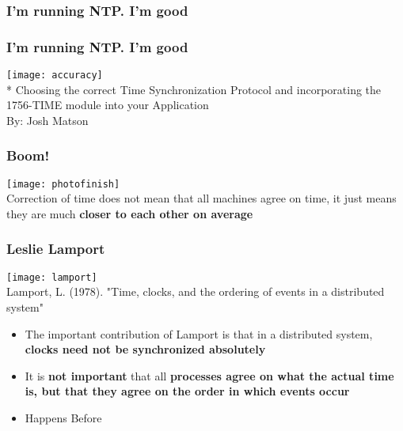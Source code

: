 \documentclass[aspectratio=169, 15pt,usenames,dvipsnames]{beamer}
\begin{document}
	\begin{gdblank}
		\frametitle{I'm running NTP. I'm good}
		\centering													   
		\LARGE
	\end{gdblank}
	\begin{gdblank}
		\frametitle{I'm running NTP. I'm good}
		\centering
		\texttt{[image: accuracy]}
		\\\tiny
		* Choosing the correct Time Synchronization Protocol and incorporating the 1756-TIME module into your Application \\ By: Josh Matson
	\end{gdblank}
	\begin{gdblank}
		\frametitle{Boom!}
		\centering
		\texttt{[image: photofinish]}
		\large \\
		Correction of time does not mean that all machines agree on time, it just means they are much \textbf{closer to each other on average}
	\end{gdblank}
	\begin{gdblank}
		\frametitle{Leslie Lamport}
		\centering
		\texttt{[image: lamport]} \\
		\large
		Lamport, L. (1978). "Time, clocks, and the ordering of events in a distributed system"
	\end{gdblank}
	\begin{gdblank}
		\centering
		\begin{itemize}
			\item The important contribution of Lamport is that in a distributed system, \textbf{clocks need not be synchronized absolutely}
			\item It is \textbf{not important} that all \textbf{processes agree on what the actual time is, but that they agree on the order in which events occur}
			\item Happens Before
		\end{itemize}		
	\end{gdblank}
\end{document}
